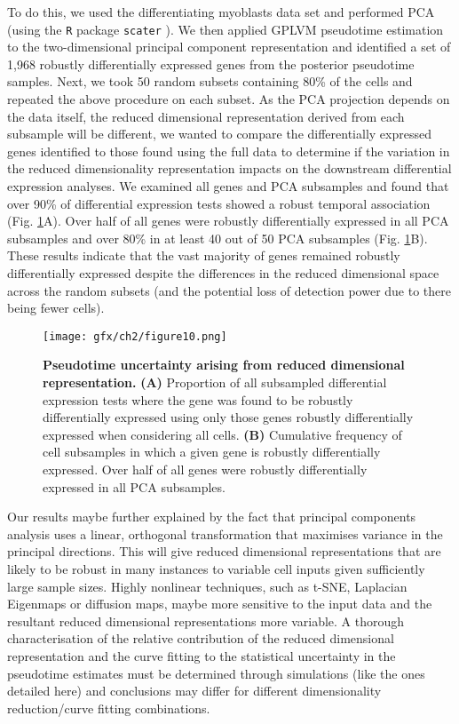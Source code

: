 To do this, we used the differentiating myoblasts data set \cite{Trapnell2014} and performed PCA (using the \texttt{R} package \texttt{scater} \cite{scater}). We then applied GPLVM pseudotime estimation to the two-dimensional principal component representation and identified a set of 1,968 robustly differentially expressed genes from the posterior pseudotime samples. Next, we took 50 random subsets containing 80\% of the cells and repeated the above procedure on each subset. As the PCA projection depends on the data itself, the reduced dimensional representation derived from each subsample will be different, we wanted to compare the differentially expressed genes identified to those found using the full data to determine if the variation in the reduced dimensionality representation impacts on the downstream differential expression analyses. We examined all genes and PCA subsamples and found that over 90\% of differential expression tests showed a robust temporal association (Fig. \ref{fig:pca_compare}A). Over half of all genes were robustly differentially expressed in all PCA subsamples and over 80\% in at least 40 out of 50 PCA subsamples (Fig. \ref{fig:pca_compare}B). These results indicate that the vast majority of genes remained robustly differentially expressed despite the differences in the reduced dimensional space across the random subsets (and the potential loss of detection power due to there being fewer cells).

\begin{figure}[h]
\centering
	\texttt{[image: gfx/ch2/figure10.png]}
\caption{ {\bf Pseudotime uncertainty arising from reduced dimensional representation.}
\textbf{(A)} Proportion of all subsampled differential expression tests where the gene was found to be robustly differentially expressed using only those genes robustly differentially expressed when considering all cells. %
\textbf{(B)} Cumulative frequency of cell subsamples in which a given gene is robustly differentially expressed. Over half of all genes were robustly differentially expressed in all PCA subsamples.} \label{fig:pca_compare}
\end{figure}

Our results maybe further explained by the fact that principal components analysis uses a linear, orthogonal transformation that maximises variance in the principal directions. This will give reduced dimensional representations that are likely to be robust in many instances to variable cell inputs given sufficiently large sample sizes. Highly nonlinear techniques, such as t-SNE, Laplacian Eigenmaps or diffusion maps, maybe more sensitive to the input data and the resultant reduced dimensional representations more variable. A thorough characterisation of the relative contribution of the reduced dimensional representation and the curve fitting to the statistical uncertainty in the pseudotime estimates must be determined through simulations (like the ones detailed here) and conclusions may differ for different dimensionality reduction/curve fitting combinations.

